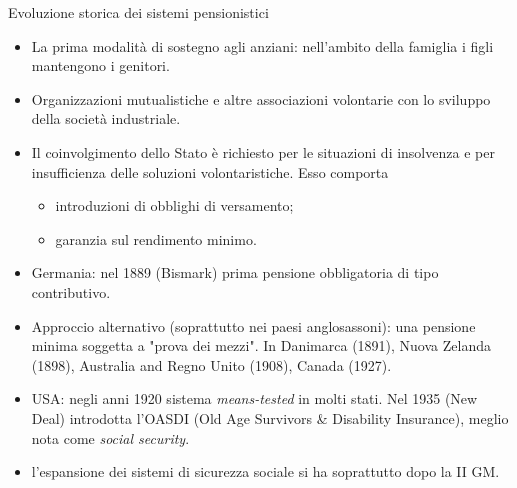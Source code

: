 \documentclass[aspectratio=64,12pt]{beamer}
\begin{document}
\begin{frame}{Evoluzione storica dei sistemi pensionistici}
\begin{resize}{.9}
\begin{itemize}
\item La prima modalità di sostegno agli anziani: nell'ambito della famiglia i
figli mantengono i genitori.
\item Organizzazioni mutualistiche e altre associazioni volontarie con lo sviluppo
della società industriale.
\item Il coinvolgimento dello Stato è richiesto per le situazioni di insolvenza e
per insufficienza delle soluzioni volontaristiche. Esso comporta
\begin{itemize}
\item introduzioni di obblighi di versamento;
\item garanzia sul rendimento minimo.
\end{itemize}
\item Germania: nel 1889 (Bismark) prima pensione obbligatoria di tipo
contributivo.
\item Approccio alternativo (soprattutto nei paesi anglosassoni): una pensione
minima soggetta a "prova dei mezzi". In Danimarca (1891), Nuova Zelanda
(1898), Australia and Regno Unito (1908), Canada (1927).
\item USA: negli anni 1920 sistema \emph{means-tested} in molti stati. Nel 1935 (New
Deal) introdotta l'OASDI (Old Age Survivors \& Disability Insurance), meglio
nota come \emph{social security}.
\item l'espansione dei sistemi di sicurezza sociale si ha soprattutto dopo la II
  GM.
\end{itemize}
\end{resize}
\end{frame}
\end{document}
